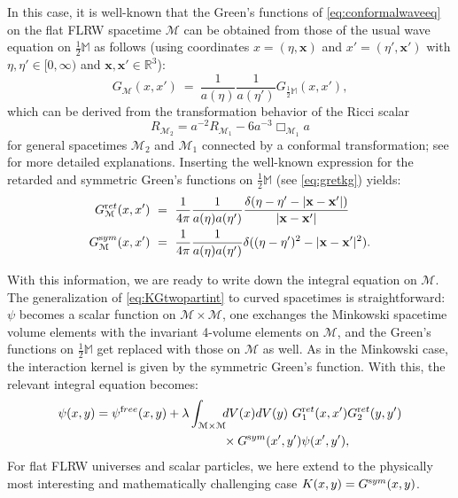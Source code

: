 \documentclass[b5paper,draft,openbib,12pt]{memoir}
\newcommand{\R}{\mathbb{R}}
\newcommand{\M}{\mathbb{M}}
\newcommand{\vx}{\mathbf{x}}
\newcommand{\ret}{{\textup ret}}
\newcommand{\sym}{{\textup sym}}
\newcommand{\free}{{\textup free}}
\begin{document}
In this case, it is well-known that the Green's 
functions of \eqref{eq:conformalwaveeq} on the flat 
FLRW spacetime $\mathcal{M}$ can be obtained from 
those of the usual wave equation on $\tfrac{1}{2}\M$ 
as follows (using coordinates $x=(\eta,\vx)$ and 
$x'=(\eta',\vx')$ with $\eta,\eta' \in [0,\infty)$ 
and $\vx,\vx' \in \R^3$):
\begin{equation}\label{eq: greens function singular interaction curved}
	G_{\mathcal{M}}(x,x') ~=~ \frac{1}{a(\eta)} \frac{1}{a(\eta')} G_{\frac{1}{2}\M}(x,x'),
\end{equation}
which can be derived from the transformation behavior of 
the Ricci scalar 
\begin{equation}
  R_{\mathcal{M}_2}=a^{-2}R_{\mathcal{M}_1}-6a^{-3}\Box_{\mathcal{M}_1} a
\end{equation}
for general spacetimes \(\mathcal{M}_2\) and \(\mathcal{M}_1\) connected by a 
conformal transformation; 
see \cite{lienertcurved,john1987hadamard} for 
more detailed explanations.
Inserting the well-known expression for the retarded 
and symmetric Green's functions on $\tfrac{1}{2}\M$ 
(see \eqref{eq:gretkg}) yields:
\begin{align}
	G_{\mathcal{M}}^\ret(x,x') ~&=~ \frac{1}{4\pi} \frac{1}{a(\eta) a(\eta')} \frac{\delta(\eta - \eta' -|\vx-\vx'|)}{|\vx-\vx'|}\nonumber\\
G_{\mathcal{M}}^\sym(x,x') ~&=~ \frac{1}{4\pi} \frac{1}{a(\eta) a(\eta')} \delta((\eta-\eta')^2-|\vx-\vx'|^2).
\end{align}

With this information, we are ready to write down 
the integral equation on $\mathcal{M}$. The 
generalization of \eqref{eq:KGtwopartint} to curved 
spacetimes is straightforward: $\psi$ becomes a 
scalar function on $\mathcal{M}\times\mathcal{M}$, 
one exchanges the Minkowski spacetime volume elements 
with the invariant 4-volume elements on $\mathcal{M}$, 
and the Green's functions on $\tfrac{1}{2}\M$ get 
replaced with those on $\mathcal{M}$ as well. As in 
the Minkowski case, the interaction kernel is given 
by the symmetric Green's function. With this, the 
relevant integral equation becomes:
\begin{align}\notag
\psi(x,y) = \psi^\free(x,y) 
+ \lambda \int_{\mathcal{M}\times \mathcal{M}} \!\!
&dV(x) dV(y)~G_1^\ret(x,x')G_2^\ret(y,y')\\
&\times  G^\sym(x',y') \psi(x',y'),
\label{eq:KGinteqcurved}
\end{align}
For flat FLRW 
universes and scalar particles, we here extend 
\cite{lienertcurved} to the physically most interesting 
and mathematically challenging case 
$K(x,y)=G^\sym(x,y)$.
\end{document}
